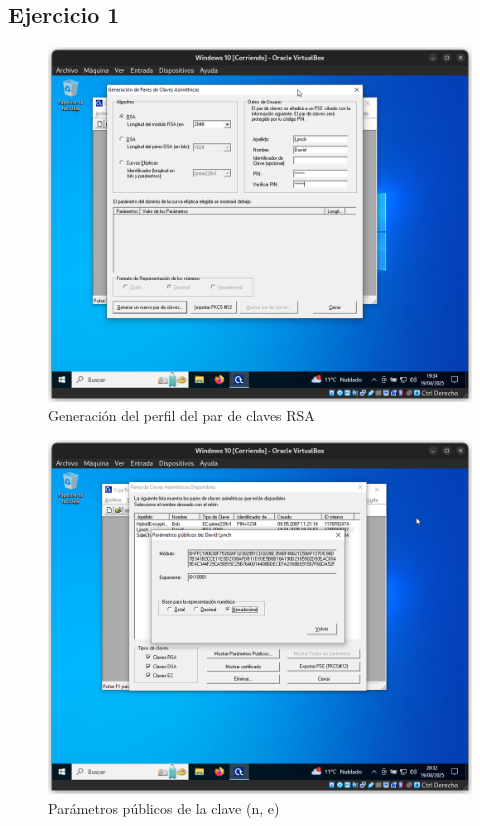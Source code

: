 \subsection{Ejercicio 1}
\graphicspath{ {img/1} }

\begin{figure}[H]
    \includegraphics[width=15cm]{ClavesRSA-01.png}
    \caption{Generación del perfil del par de claves RSA}
\end{figure}

\begin{figure}[H]
    \includegraphics[width=15cm]{ClavesRSA-02.png}
    \caption{Parámetros públicos de la clave (n, e)}
\end{figure}

